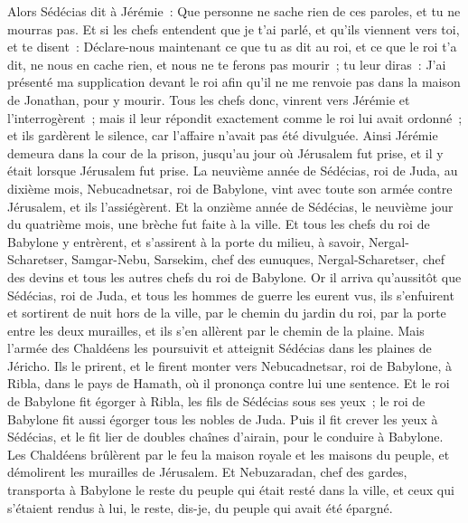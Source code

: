 \begin{multicols}{2}
Alors Sédécias dit à Jérémie~: Que personne ne sache rien de ces paroles, et tu ne mourras pas.
Et si les chefs entendent que je t'ai parlé, et qu'ils viennent vers toi, et te disent~: Déclare-nous maintenant ce que tu as dit au roi, et ce que le roi t'a dit, ne nous en cache rien, et nous ne te ferons pas mourir~;
tu leur diras~: J'ai présenté ma supplication devant le roi afin qu'il ne me renvoie pas dans la maison de Jonathan, pour y mourir.
Tous les chefs donc, vinrent vers Jérémie et l'interrogèrent~; mais il leur répondit exactement comme le roi lui avait ordonné~; et ils gardèrent le silence, car l'affaire n'avait pas été divulguée.
Ainsi Jérémie demeura dans la cour de la prison, jusqu'au jour où Jérusalem fut prise, et il y était lorsque Jérusalem fut prise.
\VerseOne{}La neuvième année de Sédécias, roi de Juda, au dixième mois, Nebucadnetsar, roi de Babylone, vint avec toute son armée contre Jérusalem, et ils l'assiégèrent.
Et la onzième année de Sédécias, le neuvième jour du quatrième mois, une brèche fut faite à la ville.
Et tous les chefs du roi de Babylone y entrèrent, et s'assirent à la porte du milieu, à savoir, Nergal-Scharetser, Samgar-Nebu, Sarsekim, chef des eunuques, Nergal-Scharetser, chef des devins et tous les autres chefs du roi de Babylone.
Or il arriva qu'aussitôt que Sédécias, roi de Juda, et tous les hommes de guerre les eurent vus, ils s'enfuirent et sortirent de nuit hors de la ville, par le chemin du jardin du roi, par la porte entre les deux murailles, et ils s'en allèrent par le chemin de la plaine.
Mais l'armée des Chaldéens les poursuivit et atteignit Sédécias dans les plaines de Jéricho. Ils le prirent, et le firent monter vers Nebucadnetsar, roi de Babylone, à Ribla, dans le pays de Hamath, où il prononça contre lui une sentence.
Et le roi de Babylone fit égorger à Ribla, les fils de Sédécias sous ses yeux~; le roi de Babylone fit aussi égorger tous les nobles de Juda.
Puis il fit crever les yeux à Sédécias, et le fit lier de doubles chaînes d'airain, pour le conduire à Babylone.
Les Chaldéens brûlèrent par le feu la maison royale et les maisons du peuple, et démolirent les murailles de Jérusalem.
Et Nebuzaradan, chef des gardes, transporta à Babylone le reste du peuple qui était resté dans la ville, et ceux qui s'étaient rendus à lui, le reste, dis-je, du peuple qui avait été épargné.

\end{multicols}
